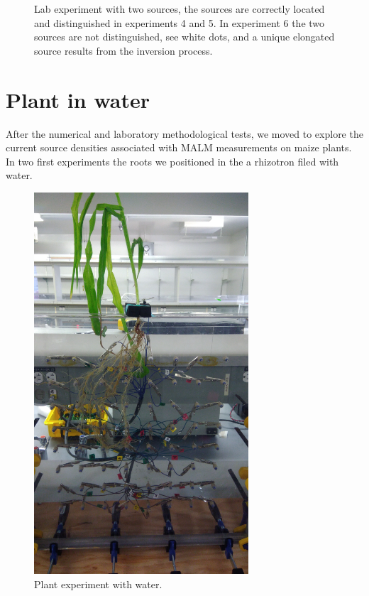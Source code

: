 \documentclass{article}
\begin{document}
\begin{figure}[h]
	\caption{Lab experiment with two sources, the sources are correctly located and distinguished in experiments 4 and 5. In experiment 6 the two sources are not distinguished, see white dots, and a unique elongated source results from the inversion process.\label{TwoSources}}
\end{figure}

\section{Plant in water}

After the numerical and laboratory methodological tests, we moved to explore the current source densities associated with MALM measurements on maize plants. In two first experiments the roots we positioned in the a rhizotron filed with water.

\begin{figure}[p]
	\centering
	\captionsetup[sub]{margin=0.4cm}
	\includegraphics[width=8cm]{plant_malm_water.jpg}
	\caption{Plant experiment with water.\label{plant_water}}
\end{figure}
\end{document}
